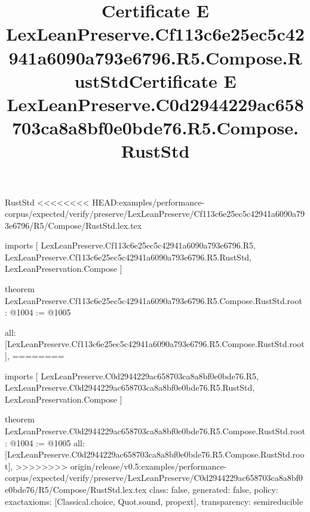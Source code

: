 \begin{lexlean}{RustStd}
<<<<<<<< HEAD:examples/performance-corpus/expected/verify/preserve/LexLeanPreserve/Cf113c6e25ec5c42941a6090a793e6796/R5/Compose/RustStd.lex.tex
\title{Certificate E LexLeanPreserve.Cf113c6e25ec5c42941a6090a793e6796.R5.Compose.RustStd}
\begin{coremodule}
imports [
  LexLeanPreserve.Cf113c6e25ec5c42941a6090a793e6796.R5,
  LexLeanPreserve.Cf113c6e25ec5c42941a6090a793e6796.R5.RustStd,
  LexLeanPreservation.Compose
]

theorem LexLeanPreserve.Cf113c6e25ec5c42941a6090a793e6796.R5.Compose.RustStd.root : @1004 := @1005 {
  all: [LexLeanPreserve.Cf113c6e25ec5c42941a6090a793e6796.R5.Compose.RustStd.root],
========
\title{Certificate E LexLeanPreserve.C0d2944229ac658703ca8a8bf0e0bde76.R5.Compose.RustStd}
\begin{coremodule}
imports [
  LexLeanPreserve.C0d2944229ac658703ca8a8bf0e0bde76.R5,
  LexLeanPreserve.C0d2944229ac658703ca8a8bf0e0bde76.R5.RustStd,
  LexLeanPreservation.Compose
]

theorem LexLeanPreserve.C0d2944229ac658703ca8a8bf0e0bde76.R5.Compose.RustStd.root : @1004 := @1005 {
  all: [LexLeanPreserve.C0d2944229ac658703ca8a8bf0e0bde76.R5.Compose.RustStd.root],
>>>>>>>> origin/release/v0.5:examples/performance-corpus/expected/verify/preserve/LexLeanPreserve/C0d2944229ac658703ca8a8bf0e0bde76/R5/Compose/RustStd.lex.tex
  class: false,
  generated: false,
  policy: exact{axioms: [Classical.choice, Quot.sound, propext]},
  transparency: semireducible
}


\end{coremodule}}
\end{coremodule}
\end{lexlean}
